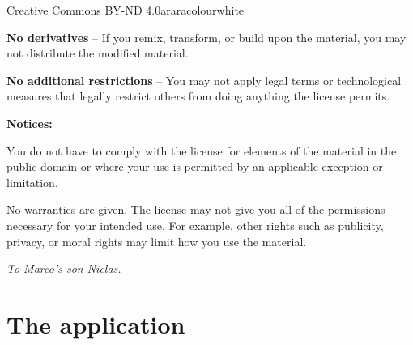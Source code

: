 \documentclass[a4paper,twoside,12pt]{memoir}
\begin{document}
\begin{messagebox}{Creative Commons BY-ND 4.0}{araracolour}{\icinfo}{white}
\vspace{1em}

\textbf{No derivatives} -- If you remix, transform, or build upon the material, you may not distribute the modified material.

\vspace{1em}

\textbf{No additional restrictions} -- You may not apply legal terms or technological measures that legally restrict others from doing anything the license permits.

\vspace{1em}

\textbf{Notices:}

\vspace{1em}

You do not have to comply with the license for elements of the material in the public domain or where your use is permitted by an applicable exception or limitation.

\vspace{1em}

No warranties are given. The license may not give you all of the permissions necessary for your intended use. For example, other rights such as publicity, privacy, or moral rights may limit how you use the material.

\vspace{1em}

{\centering\color{araracolour}\scalebox{2.0}{\ccbynd}\par} 
\end{messagebox}

\cleardoublepage

\vspace*{25em}

\begin{flushright}
\em To Marco's son Niclas.
\end{flushright}

\cleardoublepage

\tableofcontents*

\cleardoublepage

\listoffigures*

\cleardoublepage

\listoftables*

\mainmatter

\part{The application}
\label{part:application}
\end{document}

